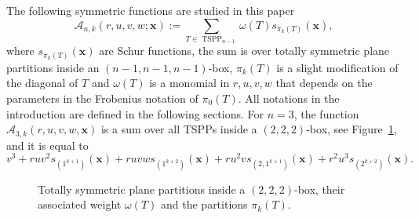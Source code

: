 \documentclass[11pt]{article}
\theoremstyle{definition}
\numberwithin{equation}{section}
\newcommand{\x}{\mathbf{x}}
\newcommand{\y}{\mathbf{y}}
\newcommand{\A}{\mathcal{A}}
\DeclareMathOperator{\TSPP}{TSPP}
\newcommand{\PlanePartition}[1]{\PlanePartitionColour{#1}{1}}
\newcounter{x}
\newcounter{y}
\newcounter{z}
\newcounter{help}
\newcommand{\PlanePartitionColour}[2]{
	\foreach \m [count=\y] in {#1}{	
		\foreach \z [count=\x] in \m{
			\setcounter{x}{\x}		
			\ifnum \z > 0		
				\TopBoundary{\x}{-\y}{\z}{#2}	
			\fi			
			\ifnum \x > 1				
				\ifnum \z < \thez				
					\setcounter{help}{\z}
					\addtocounter{help}{1}
					\foreach \zz in {\thehelp,...,\thez}{					
						\RightBoundary{(\x -1)}{(-\y)}{\zz}{#2}	
					}											
				\fi
			\fi
			\ifnum \y > 1		
				\foreach \mm [count=\yy] in {#1}{
				\ifnum \yy = \they		
				\foreach \zz [count=\xx] in \mm{	
				\ifnum \xx = \x	
				\ifnum \zz > \z	
					\setcounter{help}{\zz}
					\addtocounter{help}{-1}	
					\foreach \zzz in {\z,...,\thehelp}{
						\LeftBoundary{(\x -1)}{(1-\yy)}{\zzz}{#2}	
					}
				\fi
				\fi
				}
				\fi
				}
			\fi		
			\setcounter{z}{\z}
		}						
		\ifnum \thez >0	
			\foreach \z in {1,...,\thez}{
				\RightBoundary{\thex}{-\y}{\z}{#2}	
			}
		\fi
		\setcounter{y}{\y}
	}							
	\foreach \mm [count=\yy] in {#1}{	
	\ifnum \yy = \they
	\foreach \zz [count=\xx] in \mm{
	\ifnum \zz >0
		\foreach \zzz in {1,...,\zz}{
			\LeftBoundary{(\xx -1)}{(1-\yy)}{(\zzz-1)}{#2}
		}
	\fi
	}
	\fi
	}
	
}
\newcommand{\RightBoundaryColour}[4]{
\begin{scope}[xshift= 1cm*cos(30)*(#1+#2) , yshift=1cm*#3+1cm*sin(30)*(#2-#1)]
\draw [fill=#4] (0,0) -- ({1*cos(30)},{1*sin(30)}) -- ({1*cos(30)},{-1*sin(30)}) -- (0,-1) -- (0,0);
\end{scope}
}
\newcommand{\LeftBoundaryColour}[4]{
\begin{scope}[xshift= 1cm*cos(30)*(#1+#2) , yshift=1cm*#3+1cm*sin(30)*(#2-#1)]
\draw (0,0)[fill=#4] -- ({-1*cos(30)},{1*sin(30)}) -- ({-1*cos(30)},{-1*sin(30)}) -- (0,-1) -- (0,0);
\end{scope}
}
\newcommand{\TopBoundaryColour}[4]{
\begin{scope}[xshift= 1cm*cos(30)*(#1+#2) , yshift=1cm*#3+1cm*sin(30)*(#2-#1)]
\draw (0,0)[fill=#4] -- ({1*cos(30)},{1*sin(30)}) -- (0,1) -- ({-1*cos(30)},{1*sin(30)}) -- (0,0);
\end{scope}
}
\newcommand{\RightBoundary}[4]{
\ifnum #4 =1
	\RightBoundaryColour{#1}{#2}{#3}{green!80!black}
\else \ifnum #4=2
	\RightBoundaryColour{#1}{#2}{#3}{darkgray}
\else
	\RightBoundaryColour{#1}{#2}{#3}{white}
	\fi
\fi
}
\newcommand{\LeftBoundary}[4]{
\ifnum #4 =1
	\LeftBoundaryColour{#1}{#2}{#3}{blue}
\else \ifnum #4 = 2
	\LeftBoundaryColour{#1}{#2}{#3}{lightgray}
\else
	\LeftBoundaryColour{#1}{#2}{#3}{white}
	\fi
\fi
}
\newcommand{\TopBoundary}[4]{
\ifnum #4 =1
	\TopBoundaryColour{#1}{#2}{#3}{red}
\else \ifnum #4=2
	\TopBoundaryColour{#1}{#2}{#3}{white}
\else
	\TopBoundaryColour{#1}{#2}{#3}{white}
	\fi
\fi
}
\begin{document}
The following symmetric functions are studied in this paper
\[
\A_{n,k}(r,u,v,w; \x) := \sum_{T \in \TSPP_{n-1}} \omega(T) s_{\pi_k(T)}(\x),
\]
where $s_{\pi_k(T)}(\x)$ are Schur functions,
the sum is over totally symmetric plane partitions inside an $(n-1,n-1,n-1)$-box, $\pi_k(T)$ is a slight modification of the diagonal of $T$ and $\omega(T)$ is a monomial in $r,u,v,w$ that depends on the parameters in the Frobenius notation of $\pi_0(T)$.
All notations in the introduction are defined in the following sections. For $n=3$, the function $\A_{3,k}(r,u,v,w,\x)$ is a sum over all TSPPs inside a $(2,2,2)$-box, see Figure~\ref{fig: Example for Ank}, and it is equal to
\[
v^3 + r  u v^2 s_{(1^{k+1})}(\x) + r  uv w s_{(1^{k+2})}(\x) + r  u^2 v  s_{(2,1^{k+1})}(\x) + r^2u^3 s_{(2^{k+2})}(\x).
\]

\begin{figure}
\begin{center}
\end{center}
\caption{\label{fig: Example for Ank} Totally symmetric plane partitions inside a $(2,2,2)$-box, their associated weight $\omega(T)$ and the partitions $\pi_k(T)$.}
\end{figure}
\end{document}
